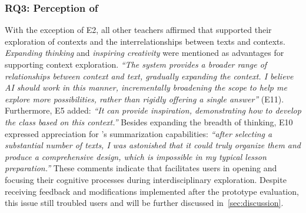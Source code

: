 \subsubsection{RQ3: Perception of \name{}}
With the exception of E2, all other teachers affirmed that \name{} supported their exploration of contexts and the interrelationships between texts and contexts. \textit{Expanding thinking} and \textit{inspiring creativity} were mentioned as advantages for supporting context exploration.
\textit{``The system provides a broader range of relationships between context and text, gradually expanding the context. I believe AI should work in this manner, incrementally broadening the scope to help me explore more possibilities, rather than rigidly offering a single answer''} (E11).
Furthermore, E5 added: \textit{``It can provide inspiration, demonstrating how to develop the class based on this context.''}
Besides expanding the breadth of thinking, E10 expressed appreciation for \name{}'s summarization capabilities: \textit{``after selecting a substantial number of texts, I was astonished that it could truly organize them and produce a comprehensive design, which is impossible in my typical lesson preparation.''} These comments indicate that \name{} facilitates users in opening and focusing their cognitive processes during interdisciplinary exploration.
Despite receiving feedback and modifications implemented after the prototype evaluation, this issue still troubled users and will be further discussed in~\ref{sec:discussion}.

